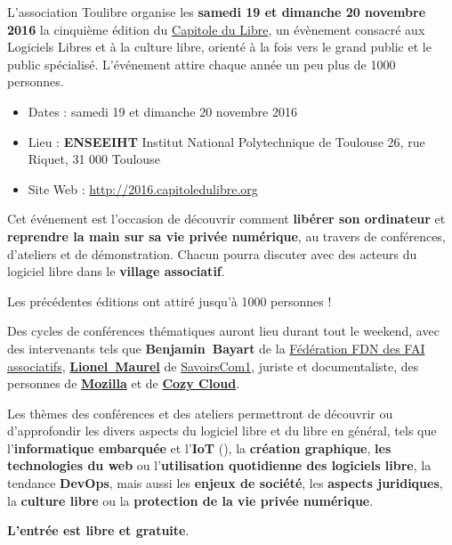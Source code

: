 
\Separateur
\par{\fontsize{14pt}{22pt}\selectfont
  L'association Toulibre organise les \textbf{samedi 19 et dimanche 20 novembre 2016} la cinquième
  édition du \href{http://capitoledulibre.org}{Capitole du Libre},
  un évènement consacré aux Logiciels Libres et à la culture libre,
  orienté à la fois vers le grand public et le public spécialisé.
  L'événement attire chaque année un peu plus de 1000 personnes.
}

\begin{itemize}[label=$\bullet$]
\item Dates : samedi 19 et dimanche 20 novembre 2016
\item Lieu : \textbf{ENSEEIHT} Institut National Polytechnique de Toulouse
26, rue Riquet, 31 000 Toulouse
\item Site Web : \href{http://capitoledulibre.org}{http://2016.capitoledulibre.org}
\end{itemize}

\Separateur

Cet événement est l'occasion de découvrir comment \textbf{libérer son ordinateur}
et \textbf{reprendre la main sur sa vie privée numérique},
au travers de conférences, d'ateliers et de démonstration.
Chacun pourra discuter avec des acteurs du logiciel libre dans le \textbf{village associatif}.

Les précédentes éditions ont attiré jusqu'à 1000 personnes !

\Separateur

Des cycles de conférences thématiques auront lieu durant tout le weekend,
avec des intervenants tels que \textbf{\mbox{Benjamin Bayart}} de la \href{https://www.ffdn.org/}{Fédération FDN des FAI associatifs},
\textbf{\href{https://scinfolex.com/}{\mbox{Lionel Maurel}}} de \href{https://www.savoirscom1.info/}{SavoirsCom1}, juriste et documentaliste,
des personnes de \textbf{\href{https://www.mozilla.org/}{Mozilla}} et de \textbf{\href{https://cozy.io/}{Cozy Cloud}}.

\Separateur

Les thèmes des conférences et des ateliers permettront de découvrir ou d'approfondir
les divers aspects du logiciel libre et du libre en général, tels que 
l'\textbf{informatique embarquée} et l'\textbf{IoT} (), la \textbf{création graphique},
\textbf{les technologies du web} ou l'\textbf{utilisation quotidienne des logiciels libre}, la tendance \textbf{DevOps},
mais aussi les \textbf{enjeux de société}, les \textbf{aspects juridiques},
la \textbf{culture libre} ou la \textbf{protection de la vie privée numérique}.

\Separateur

\textbf{L'entrée est libre et gratuite}.

